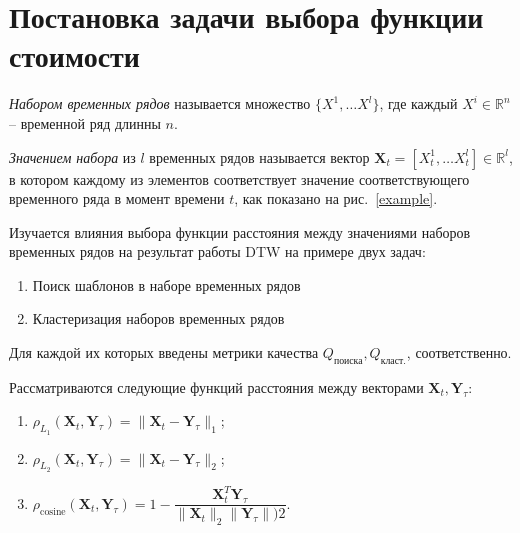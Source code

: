 \documentclass[12pt,twoside]{article}
\begin{document}
    \section{Постановка задачи выбора функции стоимости}\label{sec:problem}
    	
	   \textit{Набором временных рядов} называется множество $\{X^1,\dots X^l\}$, где каждый $X^i \in \mathbb{R}^{n}$ \--- временной ряд длинны $n$.
	     
	   \textit{Значением набора} из $l$ временных рядов называется вектор $\mathbf{X}_t = [X^1_t,\dots X^l_t] \in \mathbb{R}^l$, в котором каждому из элементов соответствует значение соответствующего временного ряда в момент времени $t$, как показано на рис.~\ref{example}.
	    
	    Изучается влияния выбора функции расстояния между значениями наборов временных рядов на результат работы DTW на примере двух задач:
        \begin{enumerate}[label=\arabic*)]
            \item Поиск шаблонов в наборе временных рядов
            \item Кластеризация наборов временных рядов
        \end{enumerate} 
        Для каждой их которых введены метрики качества $Q_\text{поиска}, Q_\text{класт.}$,  соответственно.
	  
	  

        
        Рассматриваются следующие функций расстояния между векторами $\mathbf{X}_t, \mathbf{Y}_\tau$:         
        \begin{enumerate}[label=\arabic*)]
            \item $\rho_{L_1}(\mathbf{X}_t, \mathbf{Y}_\tau) = \|\mathbf{X}_t - \mathbf{Y}_\tau \|_1$;
            \item $\rho_{L_2}(\mathbf{X}_t, \mathbf{Y}_\tau) = \|\mathbf{X}_t - \mathbf{Y}_\tau \|_2$;
            \item $\rho_\text{cosine}(\mathbf{X}_t, \mathbf{Y}_\tau) = 1 - \dfrac{\mathbf{X}^T_t \mathbf{Y}_\tau}{\|\mathbf{X}_t\|_2 \|\mathbf{Y}_\tau\|)2}$.
        \end{enumerate}
        
\end{document}

